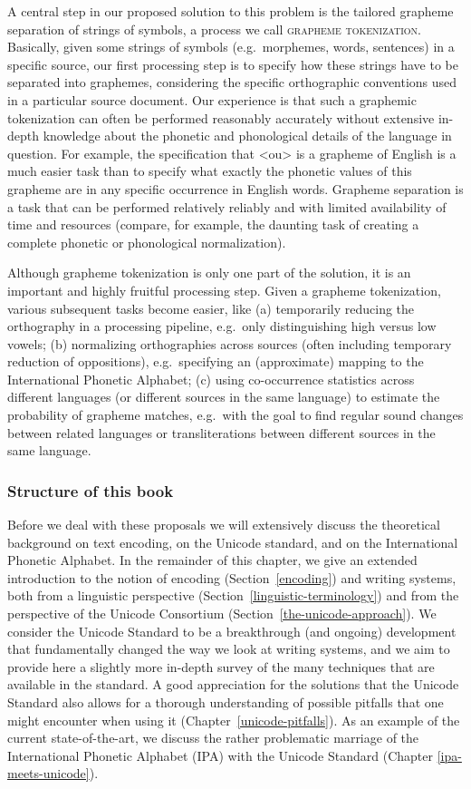 A central step in our proposed solution to this problem is the tailored grapheme
separation of strings of symbols, a process we call \textsc{grapheme
tokenization}. Basically, given some strings of symbols (e.g.~morphemes, words,
sentences) in a specific source, our first processing step is to specify how
these strings have to be separated into graphemes, considering the specific
orthographic conventions used in a particular source document. Our experience is
that such a graphemic tokenization can often be performed reasonably accurately
without extensive in-depth knowledge about the phonetic and phonological details
of the language in question. For example, the specification that <ou> is a
grapheme of English is a much easier task than to specify what exactly the
phonetic values of this grapheme are in any specific occurrence in English
words. Grapheme separation is a task that can be performed relatively reliably
and with limited availability of time and resources (compare, for example, the
daunting task of creating a complete phonetic or phonological normalization).

Although grapheme tokenization is only one part of the solution, it is an
important and highly fruitful processing step. Given a grapheme tokenization,
various subsequent tasks become easier, like (a) temporarily reducing the
orthography in a processing pipeline, e.g.~only distinguishing high versus low
vowels; (b) normalizing orthographies across sources (often including temporary
reduction of oppositions), e.g.~specifying an (approximate) mapping to the
International Phonetic Alphabet; (c) using co-occurrence statistics across
different languages (or different sources in the same language) to estimate the
probability of grapheme matches, e.g.~with the goal to find regular sound
changes between related languages or transliterations between different sources
in the same language.

\subsubsection*{Structure of this book}

Before we deal with these proposals we will extensively discuss the theoretical
background on text encoding, on the Unicode standard, and on the International
Phonetic Alphabet. In the remainder of this chapter, we give an extended
introduction to the notion of encoding (Section~\ref{encoding}) and writing
systems, both from a linguistic perspective
(Section~\ref{linguistic-terminology}) and from the perspective of the Unicode
Consortium (Section~\ref{the-unicode-approach}). We consider the Unicode
Standard to be a breakthrough (and ongoing) development that fundamentally
changed the way we look at writing systems, and we aim to provide here a
slightly more in-depth survey of the many techniques that are available in the
standard. A good appreciation for the solutions that the Unicode Standard also
allows for a thorough understanding of possible pitfalls that one might
encounter when using it (Chapter~\ref{unicode-pitfalls}). As an example of the
current state-of-the-art, we discuss the rather problematic marriage of the
International Phonetic Alphabet (IPA) with the Unicode Standard (Chapter
\ref{ipa-meets-unicode}).

